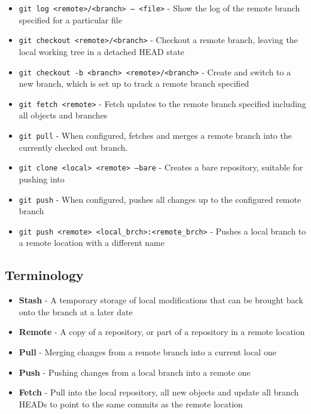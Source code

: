\begin{itemize}
\item\texttt{git log <remote>/<branch> -- <file>} - Show the log of the remote branch specified for a particular file

\item\texttt{git checkout <remote>/<branch>} - Checkout a remote branch, leaving the local working tree in a detached HEAD state

\item\texttt{git checkout -b <branch> <remote>/<branch>} - Create and switch to a new branch, which is set up to track a remote branch specified

\item\texttt{git fetch <remote>} - Fetch updates to the remote branch specified including all objects and branches

\item\texttt{git pull} - When configured, fetches and merges a remote branch into the currently checked out branch.

\item\texttt{git clone <local> <remote> --bare} - Creates a bare repository, suitable for pushing into

\item\texttt{git push} - When configured, pushes all changes up to the configured remote branch

\item\texttt{git push <remote> <local\_brch>:<remote\_brch>} - Pushes a local branch to a remote location with a different name

\end{itemize}

\subsection{Terminology}
\begin{itemize}
\item\textbf{Stash} - A temporary storage of local modifications that can be brought back onto the branch at a later date
\item\textbf{Remote} - A copy of a repository, or part of a repository in a remote location
\item\textbf{Pull} - Merging changes from a remote branch into a current local one
\item\textbf{Push} - Pushing changes from a local branch into a remote one
\item\textbf{Fetch} - Pull into the local repository, all new objects and update all branch HEADs to point to the same commits as the remote location
\end{itemize}
